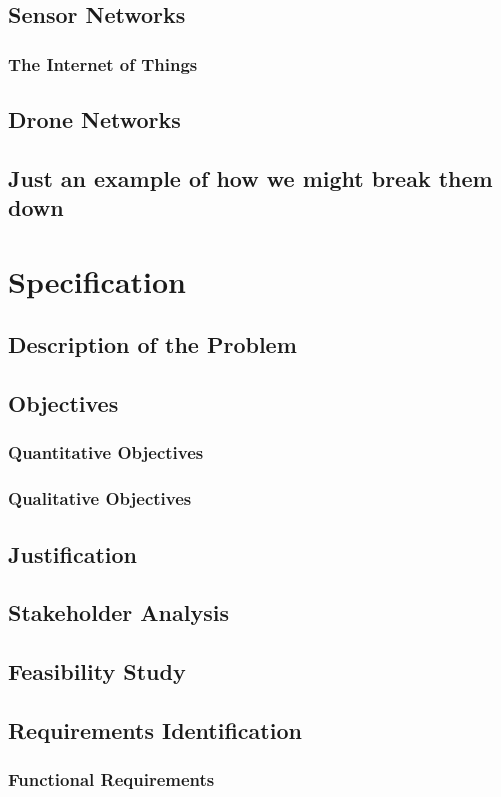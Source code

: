 \documentclass[12pt,a4paper,twoside]{report}
\begin{document}
	\section{Sensor Networks}
		\subsection{The Internet of Things}
	\section{Drone Networks}
	\section{Just an example of how we might break them down}
	
\chapter{Specification}
	\section{Description of the Problem}
\section{Objectives}
		\subsection{Quantitative Objectives}
		\subsection{Qualitative Objectives}
	\section{Justification}
	\section{Stakeholder Analysis}
	\section{Feasibility Study}
	\section{Requirements Identification}
		\subsection{Functional Requirements}
\end{document}
